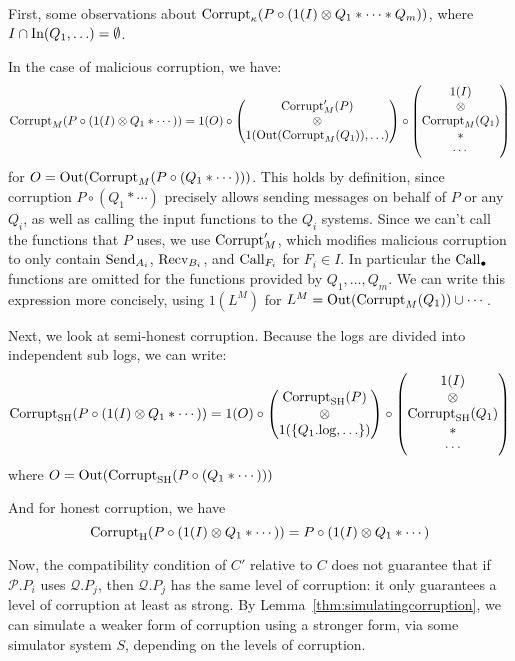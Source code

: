 \begin{theorem}
First, some observations about $\text{Corrupt}_\kappa(P \circ (1(I) \otimes Q_1 * \cdots * Q_m))$,
where ${I \cap \text{In}(Q_1, \ldots) = \emptyset}$.

In the case of malicious corruption, we have:
$$
\text{Corrupt}_M(P \circ (1(I) \otimes Q_1 * \cdots)) =
1(O) \circ
\begin{pmatrix}
  \text{Corrupt}'_M(P)\cr
  \otimes\cr
  1(\text{Out}(\text{Corrupt}_M(Q_1)), \ldots)\cr
\end{pmatrix}
\circ
\begin{pmatrix}
  1(I)\cr
  \otimes\cr
  \text{Corrupt}_M(Q_1)\cr
  *\cr
  \cdots\cr
\end{pmatrix}
$$
for $O = \text{Out}(\text{Corrupt}_M(P \circ (Q_1 * \cdots)))$.
This holds by definition, since corruption $P \circ (Q_1 * \cdots)$ precisely allows
sending messages on behalf of $P$ or any $Q_i$, as well as calling
the input functions to the $Q_i$ systems.
Since we can't call the functions that $P$ uses,
we use $\text{Corrupt}'_{M}$, which modifies malicious corruption to only
contain $\text{Send}_{A_i}$, $\text{Recv}_{B_i}$,
and $\text{Call}_{F_i}$ for $F_i \in I$.
In particular the $\text{Call}_{\bullet}$ functions are omitted for the functions
provided by $Q_1, \ldots, Q_m$.
We can write this expression more concisely,
using $1(L^M)$ for $L^M = \text{Out}(\text{Corrupt}_M(Q_1)) \cup \cdots$.

Next, we look at semi-honest corruption.
Because the logs are divided into independent sub logs, we can write:
$$
\text{Corrupt}_{\text{SH}}(P \circ (1(I) \otimes Q_1 * \cdots)) =
1(O) \circ
\begin{pmatrix}
  \text{Corrupt}_{\text{SH}}(P)\cr
  \otimes\cr
  1(\{Q_1.\text{log}, \ldots\})
\end{pmatrix}
\circ
\begin{pmatrix}
  1(I)\cr
  \otimes\cr
  \text{Corrupt}_{\text{SH}}(Q_1)\cr
  *\cr
  \cdots
\end{pmatrix}
$$
where $O = \text{Out}(\text{Corrupt}_{\text{SH}}(P \circ (Q_1 * \cdots)))$

And for honest corruption, we have
$$
\text{Corrupt}_{\text{H}}(P \circ (1(I) \otimes Q_1 * \cdots)) = P \circ (1(I) \otimes Q_1 * \cdots)
$$

Now, the compatibility condition of $C'$ relative to $C$
does not guarantee that if $\mathcal{P}.P_i$ uses $\mathcal{Q}.P_j$,
then $\mathcal{Q}.P_j$ has the same level of corruption: 
it only guarantees a level of corruption at least as strong.
By Lemma~\ref{thm:simulatingcorruption}, we can simulate a weaker
form of corruption using a stronger form, via some simulator system $S$,
depending on the levels of corruption.


\end{theorem}
